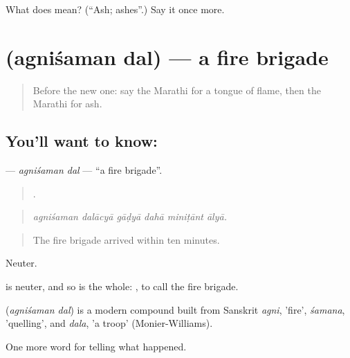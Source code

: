 \begin{tcolorbox}[breakable,colback=teal!4,colframe=teal!35!black,title={Before you move on}]
What does  mean? (\textquotedblleft{}Ash; ashes\textquotedblright{}.) Say it once more.
\end{tcolorbox}
\section[\texorpdfstring{\mr{अग्निशमन} \mr{दल} (agniśaman dal)}{अग्निशमन दल (agniśaman dal)}]{  (agniśaman dal) — a fire brigade}

\label{lesson:MR-C292-agnisaman-dal}



\begin{quote}
Before the new one: say the Marathi for a tongue of flame, then the Marathi for ash.
\end{quote}

\subsection*{You'll want to know:  }
\textbf{ } — \emph{agniśaman dal} — \textquotedblleft{}a fire brigade\textquotedblright{}.

\begin{quote}
     .
\end{quote}

\begin{quote}
\emph{agniśaman dalācyā gāḍyā dahā miniṭānt ālyā.}
\end{quote}

\begin{quote}
The fire brigade arrived within ten minutes.
\end{quote}

Neuter.

 is neuter, and so is the whole:    , to call the fire brigade.

\begin{cousinweb}
\textbf{ } (\emph{agniśaman dal}) is a modern compound built from Sanskrit \emph{agni}, 'fire', \emph{śamana}, 'quelling', and \emph{dala}, 'a troop' (Monier-Williams).
\end{cousinweb}

\begin{grammarlens}[title={What you've built}]
One more word for telling what happened.
\end{grammarlens}

